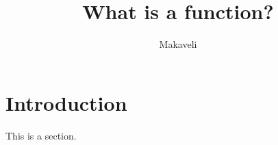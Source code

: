 \documentclass{article}
\begin{document}
\title{What is a function?}
\author{Makaveli}

\maketitle
\section{Introduction}
This is a section.\cite{expcat}

\printbibliography
\end{document}
